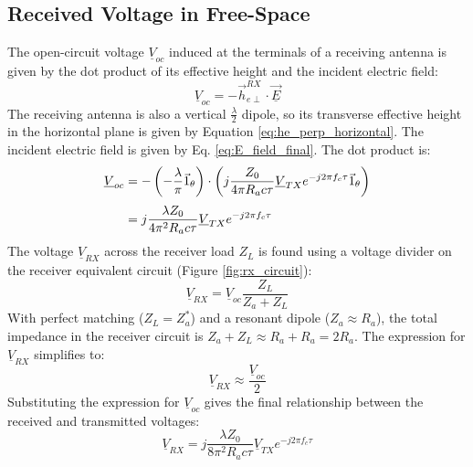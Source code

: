 \subsection{Received Voltage in Free-Space}
The open-circuit voltage $\underline{V}_{oc}$ induced at the terminals of a receiving antenna is given by the dot product of its effective height and the incident electric field:
\begin{equation}
	\underline{V}_{oc} = -\vec{h}_{e\perp}^{RX} \cdot \underline{\vec{E}}
\end{equation}
\vspace{0.5em}
The receiving antenna is also a vertical $\frac{\lambda}{2}$ dipole, so its transverse effective height in the horizontal plane is given by Equation \ref{eq:he_perp_horizontal}. The incident electric field is given by Eq. \ref{eq:E_field_final}. The dot product is:
\vspace{1em}
\begin{align}
	\underline{V}_{oc} &= -\left(-\frac{\lambda}{\pi} \vec{1}_\theta\right) \cdot \left(j \frac{Z_0}{4\pi R_a c\tau} \underline{V}_{TX} e^{-j2\pi f_c \tau} \vec{1}_\theta\right) \\[\jot]
	&= j \frac{\lambda Z_0}{4\pi^2 R_a c\tau} \underline{V}_{TX} e^{-j2\pi f_c \tau}
\end{align}
\vspace{1em}
The voltage $\underline{V}_{RX}$ across the receiver load $Z_L$ is found using a voltage divider on the receiver equivalent circuit (Figure \ref{fig:rx_circuit}):
\begin{equation}
	\underline{V}_{RX} = \underline{V}_{oc} \frac{Z_L}{Z_a + Z_L}
\end{equation}
\vspace{0.5em}
With perfect matching ($Z_L = Z_a^*$) and a resonant dipole ($Z_a \approx R_a$), the total impedance in the receiver circuit is $Z_a + Z_L \approx R_a + R_a = 2R_a$. The expression for $\underline{V}_{RX}$ simplifies to:
\begin{equation}
	\underline{V}_{RX} \approx \frac{\underline{V}_{oc}}{2}
\end{equation}
\vspace{0.5em}
Substituting the expression for $\underline{V}_{oc}$ gives the final relationship between the received and transmitted voltages:
\begin{equation}
	\boxed{\underline{V}_{RX} = j \frac{\lambda Z_0}{8\pi^2 R_a c\tau} \underline{V}_{TX} e^{-j2\pi f_c \tau}}
	\label{eq:VRX_vs_VTX}
\end{equation}
